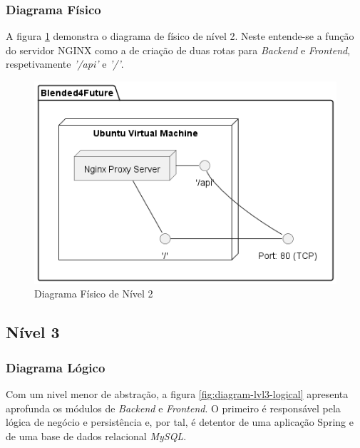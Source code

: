 \subsubsection{Diagrama Físico} 

A figura \ref{fig:diagram-lvl2-physical} demonstra o diagrama de físico de nível 2. Neste entende-se a função do servidor \gls{NGINX} como a de criação de duas rotas para \textit{Backend} e \textit{Frontend}, respetivamente \textit{'/api'} e \textit{'/'}.

\begin{figure}[h!tbp]
    \centering
    \includegraphics[width=0.6\linewidth]{capitulos/cap3-analisedoproblema/assets/arquiteturasistema/physical/physical_l2.png}
    \caption{Diagrama Físico de Nível 2}
    \label{fig:diagram-lvl2-physical}
\end{figure}




\subsection{Nível 3}

\subsubsection{Diagrama Lógico}

Com um nivel menor de abstração, a figura \ref{fig:diagram-lvl3-logical} apresenta aprofunda os módulos de \textit{Backend} e \textit{Frontend}. O primeiro é responsável pela lógica de negócio e persistência e, por tal, é detentor de uma aplicação Spring e de uma base de dados relacional \textit{MySQL}.

